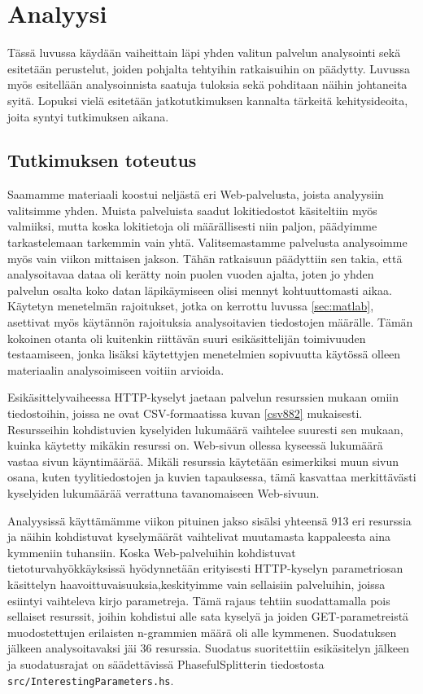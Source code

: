 
\chapter{Analyysi}

Tässä luvussa käydään vaiheittain läpi yhden valitun palvelun analysointi sekä esitetään perustelut, joiden pohjalta tehtyihin ratkaisuihin on päädytty. 
Luvussa myös esitellään analysoinnista saatuja tuloksia sekä pohditaan näihin johtaneita syitä. Lopuksi vielä esitetään jatkotutkimuksen kannalta 
tärkeitä kehitysideoita, joita syntyi tutkimuksen aikana. 
 
\section{Tutkimuksen toteutus}

Saamamme materiaali koostui neljästä eri Web-palvelusta, joista analyysiin valitsimme yhden. Muista palveluista saadut lokitiedostot käsiteltiin
myös valmiiksi, mutta koska lokitietoja oli määrällisesti niin paljon, päädyimme tarkastelemaan tarkemmin vain yhtä. Valitsemastamme palvelusta
analysoimme myös vain viikon mittaisen jakson. Tähän ratkaisuun päädyttiin sen takia, että analysoitavaa dataa oli kerätty noin puolen vuoden ajalta,
joten jo yhden palvelun osalta koko datan läpikäymiseen olisi mennyt kohtuuttomasti aikaa. Käytetyn menetelmän rajoitukset, jotka on kerrottu luvussa \ref{sec:matlab},
asettivat myös käytännön rajoituksia analysoitavien tiedostojen määrälle. Tämän kokoinen otanta oli kuitenkin riittävän suuri esikäsittelijän toimivuuden
testaamiseen, jonka lisäksi käytettyjen menetelmien sopivuutta käytössä olleen materiaalin analysoimiseen voitiin arvioida. 

Esikäsittelyvaiheessa HTTP-kyselyt jaetaan palvelun resurssien mukaan
omiin tiedostoihin, joissa ne ovat CSV-formaatissa kuvan \ref{csv882}
mukaisesti.  Resursseihin kohdistuvien kyselyiden lukumäärä vaihtelee
suuresti sen mukaan, kuinka käytetty mikäkin resurssi on. Web-sivun
ollessa kyseessä lukumäärä vastaa sivun käyntimäärää. Mikäli resurssia
käytetään esimerkiksi muun sivun osana, kuten tyylitiedostojen ja
kuvien tapauksessa, tämä kasvattaa merkittävästi kyselyiden lukumäärää
verrattuna tavanomaiseen Web-sivuun.

Analyysissä käyttämämme viikon pituinen jakso sisälsi yhteensä 913 eri
resurssia ja näihin kohdistuvat kyselymäärät vaihtelivat muutamasta
kappaleesta aina kymmeniin tuhansiin. Koska Web-palveluihin kohdistuvat 
tietoturvahyökkäyksissä hyödynnetään erityisesti HTTP-kyselyn parametriosan 
käsittelyn haavoittuvaisuuksia,keskityimme vain sellaisiin palveluihin, joissa 
esiintyi vaihteleva kirjo parametreja. Tämä rajaus tehtiin suodattamalla pois sellaiset
resurssit, joihin kohdistui alle sata kyselyä ja joiden
GET-parametreistä muodostettujen erilaisten n-grammien määrä oli alle
kymmenen. Suodatuksen jälkeen analysoitavaksi jäi 36
resurssia. Suodatus suoritettiin esikäsitelyn jälkeen ja
suodatusrajat on säädettävissä PhasefulSplitterin tiedostosta
\texttt{src/InterestingParameters.hs}.

